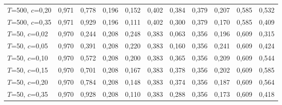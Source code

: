 \begin{longtable}{lrrrrrrrrrr}
$T$=500, $c$=0,20 & 0,971 & 0,778 & 0,196 & 0,152 & 0,402 & 0,384 & 0,379 & 0,207 & 0,585 & 0,532 \\
$T$=500, $c$=0,35 & 0,971 & 0,929 & 0,196 & 0,111 & 0,402 & 0,300 & 0,379 & 0,170 & 0,585 & 0,409 \\
$T$=50, $c$=0,02 & 0,970 & 0,244 & 0,208 & 0,248 & 0,383 & 0,063 & 0,356 & 0,196 & 0,609 & 0,315 \\
$T$=50, $c$=0,05 & 0,970 & 0,391 & 0,208 & 0,220 & 0,383 & 0,160 & 0,356 & 0,241 & 0,609 & 0,424 \\
$T$=50, $c$=0,10 & 0,970 & 0,572 & 0,208 & 0,200 & 0,383 & 0,365 & 0,356 & 0,209 & 0,609 & 0,544 \\
$T$=50, $c$=0,15 & 0,970 & 0,701 & 0,208 & 0,167 & 0,383 & 0,378 & 0,356 & 0,202 & 0,609 & 0,585 \\
$T$=50, $c$=0,20 & 0,970 & 0,784 & 0,208 & 0,148 & 0,383 & 0,374 & 0,356 & 0,187 & 0,609 & 0,564 \\
$T$=50, $c$=0,35 & 0,970 & 0,928 & 0,208 & 0,110 & 0,383 & 0,288 & 0,356 & 0,173 & 0,609 & 0,418 \\
\bottomrule
\end{longtable}
